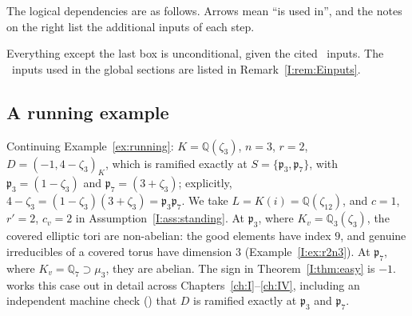 The logical dependencies are as follows. Arrows mean ``is used in'', and the notes on the right list the additional inputs of each step.
\begin{center}
\end{center}
Everything except the last box is unconditional, given the cited \Ev\ inputs. The \Ev\ inputs used in the global sections are listed in Remark~\ref{I:rem:Einputs}.

\subsection{A running example}\label{I:subsec:runningexample}
Continuing Example~\ref{ex:running}: $K=\mathbb{Q}(\zeta_3)$, $n=3$, $r=2$, $D=(-1,4-\zeta_3)_K$, which is ramified exactly at $S=\{\mathfrak p_3,\mathfrak p_7\}$, with $\mathfrak p_3=(1-\zeta_3)$ and $\mathfrak p_7=(3+\zeta_3)$; explicitly, $4-\zeta_3=(1-\zeta_3)(3+\zeta_3)=\mathfrak p_3\mathfrak p_7$. We take $L=K(i)=\mathbb{Q}(\zeta_{12})$, and $c=1$, $r'=2$, $c_v=2$ in Assumption~\ref{I:ass:standing}. At $\mathfrak p_3$, where $K_v=\mathbb{Q}_3(\zeta_3)$, the covered elliptic tori are non-abelian: the good elements have index $9$, and genuine irreducibles of a covered torus have dimension $3$ (Example~\ref{I:ex:r2n3}). At $\mathfrak p_7$, where $K_v=\mathbb{Q}_7\supset\mu_3$, they are abelian. The sign in Theorem~\ref{I:thm:easy} is $-1$. \cite{JC26b} works this case out in detail across Chapters~\ref{ch:I}--\ref{ch:IV}, including an independent machine check (\cite[\S1]{JC26b}) that $D$ is ramified exactly at $\mathfrak p_3$ and $\mathfrak p_7$.

